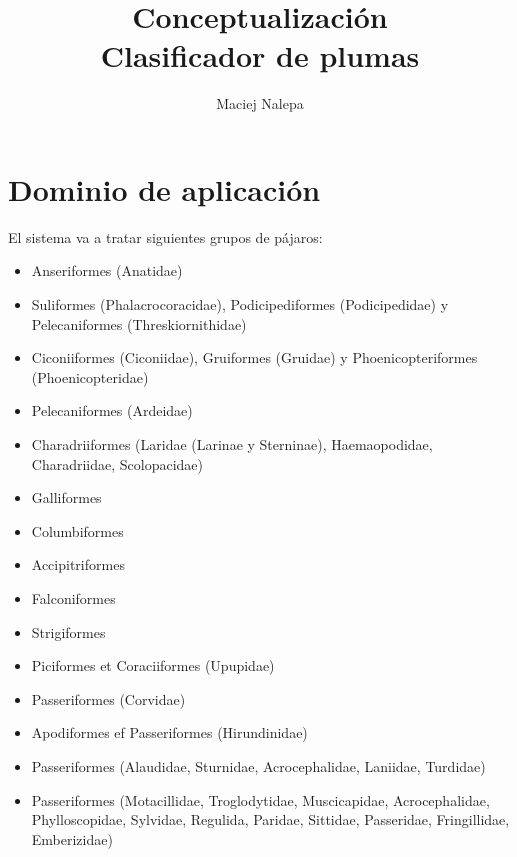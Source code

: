 \documentclass[a4paper,12pt]{article}
\title{Conceptualización\\ \normalsize{Clasificador de plumas}}
\author{Maciej Nalepa}
\begin{document}
\maketitle

\section{Dominio de aplicación}
El sistema va a tratar siguientes grupos de pájaros:
\begin{itemize}
	\item Anseriformes (Anatidae)
	\item Suliformes (Phalacrocoracidae), Podicipediformes (Podicipedidae) y Pelecaniformes (Threskiornithidae)
	\item Ciconiiformes (Ciconiidae), Gruiformes (Gruidae) y Phoenicopteriformes (Phoenicopteridae)
	\item Pelecaniformes (Ardeidae)
	\item Charadriiformes (Laridae (Larinae y Sterninae), Haemaopodidae, Charadriidae, Scolopacidae)
	\item Galliformes
	\item Columbiformes
	\item Accipitriformes
	\item Falconiformes
	\item Strigiformes
	\item Piciformes et Coraciiformes (Upupidae)
	\item Passeriformes (Corvidae)
	\item Apodiformes ef Passeriformes (Hirundinidae)
	\item Passeriformes (Alaudidae, Sturnidae, Acrocephalidae, Laniidae, Turdidae)
	\item Passeriformes (Motacillidae, Troglodytidae, Muscicapidae, Acrocephalidae, Phylloscopidae, Sylvidae, Regulida, Paridae, Sittidae, Passeridae, Fringillidae, Emberizidae)
\end{itemize}
\end{document}

